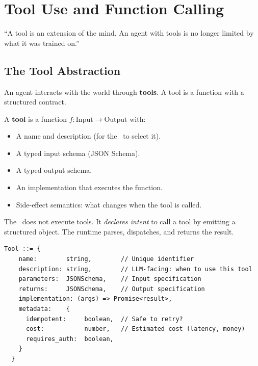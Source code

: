 \chapter{Tool Use and Function Calling}
\label{ch:tool-use}

\epigraph{``A tool is an extension of the mind. An agent with tools is no longer limited by what it was trained on.''}{}


\section{The Tool Abstraction}

An agent interacts with the world through \textbf{tools}. A tool is a function with a structured contract.

\begin{definition}[Tool]
	A \textbf{tool} is a function $f: \text{Input} \to \text{Output}$ with:
	\begin{itemize}
		\item A name and description (for the \llm\ to select it).
		\item A typed input schema (JSON Schema).
		\item A typed output schema.
		\item An implementation that executes the function.
		\item Side-effect semantics: what changes when the tool is called.
	\end{itemize}
\end{definition}

The \llm\ does not execute tools. It \emph{declares intent} to call a tool by emitting a structured object. The runtime parses, dispatches, and returns the result.

\begin{lstlisting}[caption=Tool definition schema (OpenAPI-compatible)]
  Tool ::= {
    name:        string,        // Unique identifier
    description: string,        // LLM-facing: when to use this tool
    parameters:  JSONSchema,    // Input specification
    returns:     JSONSchema,    // Output specification
    implementation: (args) => Promise<result>,
    metadata:    {
      idempotent:     boolean,  // Safe to retry?
      cost:           number,   // Estimated cost (latency, money)
      requires_auth:  boolean,
    }
  }
\end{lstlisting}

